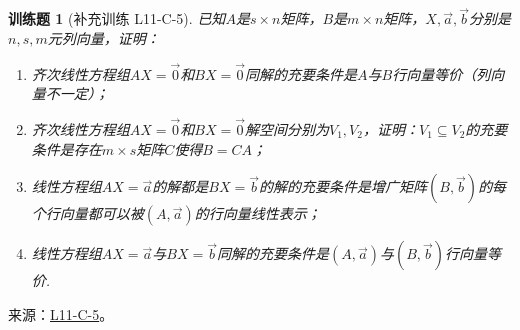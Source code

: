 \documentclass[UTF8,12pt,a4paper,fontset=fandol]{ctexart}
\newtheorem{exercise}{训练题}[section]
\begin{document}
\begin{exercise}[补充训练 L11-C-5]\label{prob:L11-C-5}
已知$A$是$s \times n$矩阵，$B$是$m \times n$矩阵，$X,\vec{a},\vec{b}$分别是$n,s,m$元列向量，证明：
        \begin{enumerate}
            \item 齐次线性方程组$AX=\vec{0}$和$BX=\vec{0}$同解的充要条件是$A$与$B$行向量等价（列向量不一定）；

            \item 齐次线性方程组$AX=\vec{0}$和$BX=\vec{0}$解空间分别为$V_1,V_2$，证明：$V_1 \subseteq V_2$的充要条件是存在$m \times s$矩阵$C$使得$B=CA$；

            \item 线性方程组$AX=\vec{a}$的解都是$BX=\vec{b}$的解的充要条件是增广矩阵$(B,\vec{b})$的每个行向量都可以被$(A,\vec{a})$的行向量线性表示；

            \item 线性方程组$AX=\vec{a}$与$BX=\vec{b}$同解的充要条件是$(A,\vec{a})$与$(B,\vec{b})$行向量等价.
        \end{enumerate}
\end{exercise}
\noindent 来源：\href{https://github.com/yhwu-is/Linear-Algebra-Left-Undone/blob/new/%E8%AE%B2%E4%B9%89/%E4%B8%93%E9%A2%98/11%20%E6%9C%9D%E8%8A%B1%E5%A4%95%E6%8B%BE.tex}{L11-C-5}。
\end{document}
